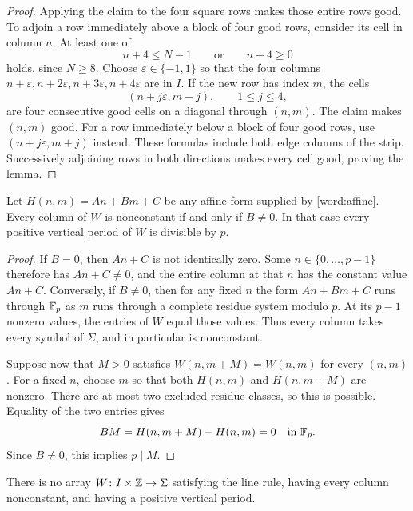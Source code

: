\begin{proof}
Applying the claim to the four square rows makes those entire rows good.
To adjoin a row immediately above a block of four good rows, consider
its cell in column $n$.  At least one of
\[
    n+4\leq N-1\qquad\text{or}\qquad n-4\geq0
\]
holds, since $N\geq8$.  Choose $\varepsilon\in\{-1,1\}$ so that the four
columns $n+\varepsilon,n+2\varepsilon,n+3\varepsilon,n+4\varepsilon$
are in $I$.  If the new row has index $m$, the cells
\[
    (n+j\varepsilon,m-j),\qquad 1\leq j\leq4,
\]
are four consecutive good cells on a diagonal through $(n,m)$.  The
claim makes $(n,m)$ good.  For a row immediately below a block of four
good rows, use $(n+j\varepsilon,m+j)$ instead.  These formulas include
both edge columns of the strip.  Successively adjoining rows in both
directions makes every cell good, proving the lemma.
\end{proof}

\begin{lemma}
\label{word:vertical}
Let $H(n,m)=An+Bm+C$ be any affine form supplied by
\cref{word:affine}.  Every column of $W$ is nonconstant if and only if
$B\ne0$.  In that case every positive vertical period of $W$ is
divisible by $p$.
\end{lemma}

\begin{proof}
If $B=0$, then $An+C$ is not identically zero.  Some $n\in\{0,\ldots,p-1\}$
therefore has $An+C\ne0$, and the entire column at that $n$ has the
constant value $An+C$.  Conversely, if $B\ne0$, then for any fixed $n$
the form $An+Bm+C$ runs through $\mathbb F_p$ as $m$ runs through a complete
residue system modulo $p$.  At its $p-1$ nonzero values, the entries of
$W$ equal those values.  Thus every column takes every symbol of
$\Sigma$, and in particular is nonconstant.

Suppose now that $M>0$ satisfies $W(n,m+M)=W(n,m)$ for every $(n,m)$.
For a fixed $n$, choose $m$ so that both $H(n,m)$ and $H(n,m+M)$ are
nonzero.  There are at most two excluded residue classes, so this is
possible.  Equality of the two entries gives
\[
    BM=H(n,m+M)-H(n,m)=0\quad\text{in }\mathbb F_p.
\]
Since $B\ne0$, this implies $p\mid M$.
\end{proof}

\begin{proposition}
\label{word:obstruction}
There is no array $W\colon I\times\mathbb Z\to\Sigma$ satisfying the line rule,
having every column nonconstant, and having a positive vertical period.
\end{proposition}

